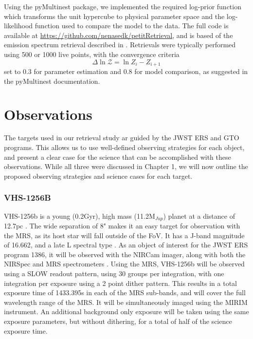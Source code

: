 Using the pyMultinest package, we implemented the required log-prior function which transforms the unit hypercube to physical parameter space and the log-likelihood function used to compare the model to the data. The full code is available at \url{https://github.com/nenasedk/petitRetrieval}, and is based of the emission spectrum retrieval described in \parencite{Molliere2019}. 
Retrievals were typically performed using 500 or 1000 live points, with the convergence criteria 
\begin{equation}
\Delta\ln\mathcal{Z} = \ln{Z_{i} - Z_{i+1}}
\end{equation}
set to 0.3 for parameter estimation and 0.8 for model comparison, as suggested in the pyMultinest documentation.

\section{Observations}\label{sec:obs}
The targets used in our retrieval study ar guided by the JWST ERS and GTO programs. This allows us to use well-defined observing strategies for each object, and present a clear case for the science that can be accomplished with these observations.
While all three were discussed in Chapter 1, we will now outline the proposed observing strategies and science cases for each target.
\subsubsection{VHS-1256B}
VHS-1256b is a young (0.2Gyr), high mass (11.2M$_{Jup}$) planet at a distance of 12.7pc \parencite{Bowler2016}. 
The wide separation of 8" makes it an easy target for observation with the MRS, as its host star will fall outside of the FoV.
It has a J-band magnitude of 16.662, and a late L spectral type \parencite{Miles2018}.
As an object of interest for the JWST ERS program 1386, it will be observed with the NIRCam imager, along with both the NIRSpec and MRS spectrometers \parencite{Hinkley2019}.
Using the MRS, VHS-1256b will be observed using a SLOW readout pattern, using 30 groups per integration, with one integration per exposure using a 2 point dither pattern.
This results in a total exposure time of 1433.395s in each of the MRS sub-bands, and will cover the full wavelength range of the MRS.
It will be simultaneously imaged using the MIRIM instrument.
An additional background only exposure will be taken using the same exposure parameters, but without dithering, for a total of half of the science exposure time.


